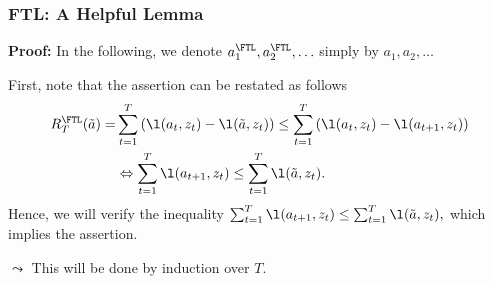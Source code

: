 \documentclass[11pt,compress,t,notes=noshow, xcolor=table]{beamer}
\begin{document}
\begin{frame} 
	\frametitle{FTL: A Helpful Lemma}
	\small
		\textbf{Proof:}
		In the following, we denote  $a_1^{\FTL}, a_2^{\FTL}, \ldots$  simply by  $a_1, a_2, \ldots$  	
		\pause
		
		 First, note that the assertion can be restated as follows
		\begin{equation*}
			\begin{split}
			R_T^{\FTL}(\tilde a) = &\sum\limits_{t=1}^T \left(\l(a_t,z_t) - \l(\tilde a,z_t)\right) \leq \sum\limits_{t=1}^T \left(\l(a_t,z_t) - \l(a_{t+1},z_t)\right) \\
				 &\Leftrightarrow \sum\limits_{t=1}^T \l(a_{t+1},z_t) \leq  \sum\limits_{t=1}^T \l(\tilde a,z_t).
			\end{split} 
		\end{equation*}
		\pause
		 Hence, we will verify the inequality $\sum\nolimits_{t=1}^T \l(a_{t+1},z_t) \leq  \sum\nolimits_{t=1}^T \l(\tilde a,z_t),$ which implies the assertion.
		 \lz
		 
		 $\leadsto$ This will be done  by induction over $T$.
\end{frame}
\end{document}
